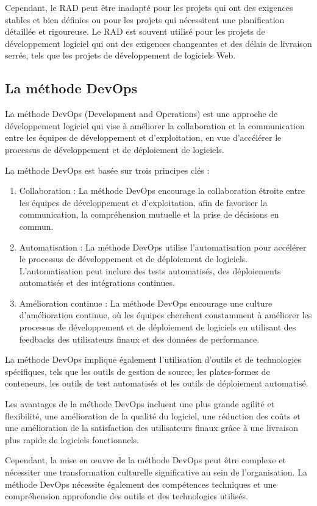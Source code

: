 Cependant, le RAD peut être inadapté pour les projets qui ont des exigences stables et bien 
définies ou pour les projets qui nécessitent une planification détaillée et rigoureuse. 
Le RAD est souvent utilisé pour les projets de développement logiciel qui ont des exigences 
changeantes et des délais de livraison serrés, tels que les projets de développement de logiciels
Web.

\subsection{La méthode DevOps}\label{subsec:methode-devops}
La méthode DevOps (Development and Operations) est une approche de développement logiciel qui 
vise à améliorer la collaboration et la communication entre les équipes de développement et 
d'exploitation, en vue d'accélérer le processus de développement et de déploiement de logiciels.

La méthode DevOps est basée sur trois principes clés :
\begin{enumerate}
    \item Collaboration : La méthode DevOps encourage la collaboration étroite entre les équipes de développement et d'exploitation, afin de favoriser la communication, la compréhension mutuelle et la prise de décisions en commun.
    \item Automatisation : La méthode DevOps utilise l'automatisation pour accélérer le processus de développement et de déploiement de logiciels. L'automatisation peut inclure des tests automatisés, des déploiements automatisés et des intégrations continues.
    \item Amélioration continue : La méthode DevOps encourage une culture d'amélioration continue, où les équipes cherchent constamment à améliorer les processus de développement et de déploiement de logiciels en utilisant des feedbacks des utilisateurs finaux et des données de performance.
\end{enumerate}

La méthode DevOps implique également l'utilisation d'outils et de technologies spécifiques, tels que les outils de gestion de source, les plates-formes de conteneurs, les outils de test automatisés et les outils de déploiement automatisé.

Les avantages de la méthode DevOps incluent une plus grande agilité et flexibilité, une amélioration de la qualité du logiciel, une réduction des coûts et une amélioration de la satisfaction des utilisateurs finaux grâce à une livraison plus rapide de logiciels fonctionnels.

Cependant, la mise en œuvre de la méthode DevOps peut être complexe et nécessiter une transformation culturelle significative au sein de l'organisation. La méthode DevOps nécessite également des compétences techniques et une compréhension approfondie des outils et des technologies utilisés.
